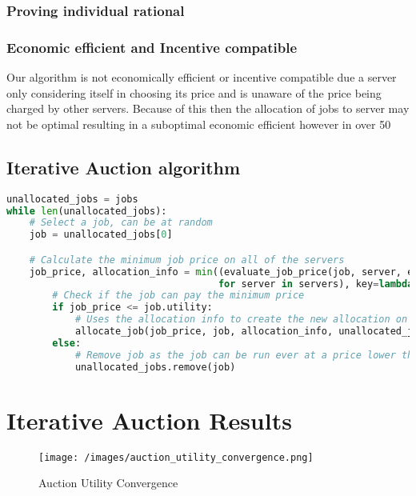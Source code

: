\subsubsection{Proving individual rational}
\subsubsection{Economic efficient and Incentive compatible}
Our algorithm is not economically efficient or incentive compatible due a server only considering itself in choosing its
price and is unaware of the price being charged by other servers. Because of this then the allocation of jobs to server
may not be optimal resulting in a suboptimal economic efficient however in over 50%

\subsection{Iterative Auction algorithm}\label{subsec:iterative-auction-algorithm}
\begin{lstlisting}[language=Python]
unallocated_jobs = jobs
while len(unallocated_jobs):
    # Select a job, can be at random
    job = unallocated_jobs[0]

    # Calculate the minimum job price on all of the servers
    job_price, allocation_info = min((evaluate_job_price(job, server, epsilon=epsilon)
                                     for server in servers), key=lambda bid: bid[0])
        # Check if the job can pay the minimum price
        if job_price <= job.utility:
            # Uses the allocation info to create the new allocation on the selected server
            allocate_job(job_price, job, allocation_info, unallocated_jobs)
        else:
            # Remove job as the job can be run ever at a price lower than the job's value utility
            unallocated_jobs.remove(job)
\end{lstlisting}

\section{Iterative Auction Results}\label{sec:auctions-results}
\begin{figure}[H]
    \centering
    \texttt{[image: /images/auction\_utility\_convergence.png]}
    \caption{Auction Utility Convergence}
\end{figure}


